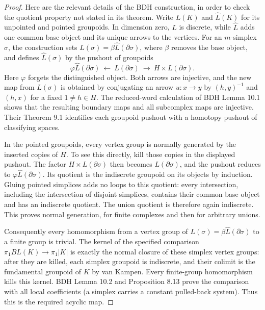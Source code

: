 \begin{proof}
Here are the relevant details of the BDH construction, in order to
check the quotient property not stated in its theorem. Write $L(K)$
and $\widehat L(K)$ for its unpointed and pointed groupoids. In
dimension zero, $L$ is discrete, while $\widehat L$ adds one common
base object and its unique arrows to the vertices. For an
$m$-simplex $\sigma$, the construction sets
$L(\sigma)=\beta\widehat L(\partial\sigma)$, where $\beta$ removes
the base object, and defines $\widehat L(\sigma)$ by the pushout
of groupoids
\[
 \varphi\widehat L(\partial\sigma)
 \ \longleftarrow\ L(\partial\sigma)
 \ \longrightarrow\ H\times L(\partial\sigma).
\]
Here $\varphi$ forgets the distinguished object. Both arrows are
injective, and the new map from $L(\sigma)$ is obtained by conjugating
an arrow $u:x\to y$ by $(h,y)^{-1}$ and $(h,x)$ for a fixed
$1\ne h\in H$. The reduced-word calculation of BDH Lemma 10.1
shows that the resulting boundary maps and all subcomplex maps are
injective. Their Theorem 9.1 identifies each groupoid pushout with
a homotopy pushout of classifying spaces.

In the pointed groupoids, every vertex group is normally generated
by the inserted copies of $H$. To see this directly, kill those
copies in the displayed pushout. The factor $H\times
L(\partial\sigma)$ then becomes $L(\partial\sigma)$, and the
pushout reduces to $\varphi\widehat L(\partial\sigma)$. Its quotient
is the indiscrete groupoid on its objects by induction. Gluing
pointed simplices adds no loops to this quotient: every intersection,
including the intersection of disjoint simplices, contains their
common base object and has an indiscrete quotient. The union quotient
is therefore again indiscrete. This proves normal generation, for
finite complexes and then for arbitrary unions.

Consequently every homomorphism from a vertex group of
$L(\sigma)=\beta\widehat L(\partial\sigma)$ to a finite group is
trivial. The kernel of the specified comparison
$\pi_1BL(K)\to\pi_1|K|$ is exactly the normal closure of these
simplex vertex groups: after they are killed, each simplex groupoid
is indiscrete, and their colimit is the fundamental groupoid of
$K$ by van Kampen. Every finite-group homomorphism kills this
kernel. BDH Lemma 10.2 and Proposition 8.13 prove the comparison
with all local coefficients (a simplex carries a constant pulled-back
system). Thus this is the required acyclic map.


\end{proof}
